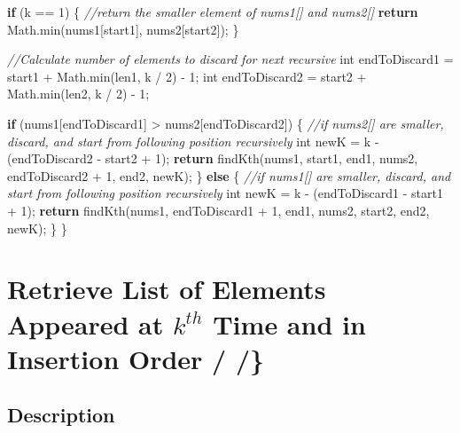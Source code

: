 \documentclass[]{book}
\newenvironment{Shaded}{\begin{snugshade}}{\end{snugshade}}
\newcommand{\BuiltInTok}[1]{#1}
\newcommand{\CommentTok}[1]{\textcolor[rgb]{0.56,0.35,0.01}{\textit{#1}}}
\newcommand{\DataTypeTok}[1]{\textcolor[rgb]{0.13,0.29,0.53}{#1}}
\newcommand{\DecValTok}[1]{\textcolor[rgb]{0.00,0.00,0.81}{#1}}
\newcommand{\FunctionTok}[1]{\textcolor[rgb]{0.00,0.00,0.00}{#1}}
\newcommand{\KeywordTok}[1]{\textcolor[rgb]{0.13,0.29,0.53}{\textbf{#1}}}
\newcommand{\NormalTok}[1]{#1}
\begin{document}
\begin{Shaded}
\begin{Highlighting}[]
    \KeywordTok{if}\NormalTok{ (k == }\DecValTok{1}\NormalTok{) \{}
        \CommentTok{//return the smaller element of nums1[] and nums2[]}
        \KeywordTok{return} \BuiltInTok{Math}\NormalTok{.}\FunctionTok{min}\NormalTok{(nums1[start1], nums2[start2]);}
\NormalTok{    \}}

    \CommentTok{//Calculate number of elements to discard for next recursive}
    \DataTypeTok{int}\NormalTok{ endToDiscard1 = start1 + }\BuiltInTok{Math}\NormalTok{.}\FunctionTok{min}\NormalTok{(len1, k / }\DecValTok{2}\NormalTok{) - }\DecValTok{1}\NormalTok{;}
    \DataTypeTok{int}\NormalTok{ endToDiscard2 = start2 + }\BuiltInTok{Math}\NormalTok{.}\FunctionTok{min}\NormalTok{(len2, k / }\DecValTok{2}\NormalTok{) - }\DecValTok{1}\NormalTok{;}

    \KeywordTok{if}\NormalTok{ (nums1[endToDiscard1] > nums2[endToDiscard2]) \{}
        \CommentTok{//if nums2[] are smaller, discard, and start from following position recursively}
        \DataTypeTok{int}\NormalTok{ newK = k - (endToDiscard2 - start2 + }\DecValTok{1}\NormalTok{);}
        \KeywordTok{return} \FunctionTok{findKth}\NormalTok{(nums1, start1, end1, nums2, endToDiscard2 + }\DecValTok{1}\NormalTok{, end2, newK);}
\NormalTok{    \} }\KeywordTok{else}\NormalTok{ \{}
        \CommentTok{//if nums1[] are smaller, discard, and start from following position recursively}
        \DataTypeTok{int}\NormalTok{ newK = k - (endToDiscard1 - start1 + }\DecValTok{1}\NormalTok{);}
        \KeywordTok{return} \FunctionTok{findKth}\NormalTok{(nums1, endToDiscard1 + }\DecValTok{1}\NormalTok{, end1, nums2, start2, end2, newK);}
\NormalTok{    \}}
\NormalTok{\}}
\end{Highlighting}
\end{Shaded}

\hypertarget{retrieve-list-of-elements-appeared-at-kth-time-and-in-insertion-order}{%
\section{\texorpdfstring{Retrieve List of Elements Appeared at \(k^{th}\) Time and in Insertion Order / /\}}{Retrieve List of Elements Appeared at k\^{}\{th\} Time and in Insertion Order / /\}}}\label{retrieve-list-of-elements-appeared-at-kth-time-and-in-insertion-order}}

\hypertarget{description-12}{%
\subsection{Description}\label{description-12}}
\end{document}

